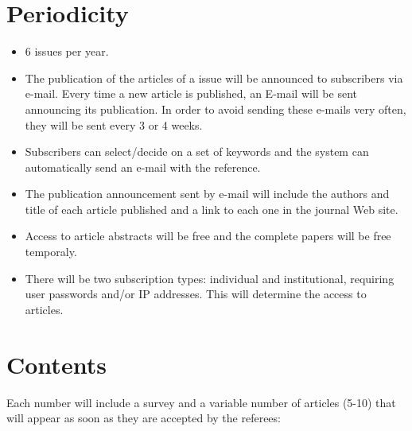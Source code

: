 \documentclass[twoside,a4paper,11pt]{article}
\begin{document}
\section{Periodicity}

\begin{itemize}
\item 6 issues per year.
\item The publication of the articles of a issue will be announced
      to subscribers via e-mail. Every time a new article is published,
      an E-mail will be sent announcing its publication. In order to
      avoid sending these e-mails very often, they will be sent every
      3 or 4 weeks.

\item Subscribers can select/decide on a set of keywords and the
      system can automatically send an e-mail with the reference.
\item The publication announcement sent by e-mail will include
      the authors and title of each article published and a link to
      each one in the journal Web site.
\item Access to article abstracts will be free and the complete papers will be
      free temporaly.
\item There will be two subscription types: individual and institutional,
      requiring user passwords and/or IP addresses. This will
      determine the access to articles.
\end{itemize}

\section{Contents}

Each number will include a survey and a variable number of articles
(5-10) that will  appear as soon as they are accepted by the referees:
\end{document}
